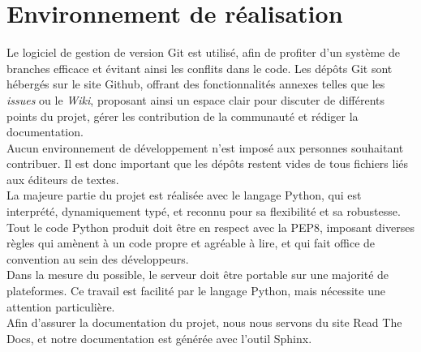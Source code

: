\section{Environnement de réalisation}
Le logiciel de gestion de version Git est utilisé, afin de profiter d'un système de branches efficace et évitant ainsi les conflits dans le code.
Les dépôts Git sont hébergés sur le site Github, offrant des fonctionnalités annexes telles que les \textit{issues} ou le \textit{Wiki}, proposant ainsi un espace clair pour discuter de différents points du projet, gérer les contribution de la communauté et rédiger la documentation.\\

Aucun environnement de développement n'est imposé aux personnes souhaitant contribuer. Il est donc important que les dépôts restent vides de tous fichiers liés aux éditeurs de textes.\\

La majeure partie du projet est réalisée avec le langage Python, qui est interprété, dynamiquement typé, et reconnu pour sa flexibilité et sa robustesse.\\

Tout le code Python produit doit être en respect avec la PEP8, imposant diverses règles qui amènent à un code propre et agréable à lire, et qui fait office de convention au sein des développeurs.\\

Dans la mesure du possible, le serveur doit être portable sur une majorité de plateformes. Ce travail est facilité par le langage Python, mais nécessite une attention particulière.\\

Afin d'assurer la documentation du projet, nous nous servons du site Read The Docs, et notre documentation est générée avec l'outil Sphinx.
